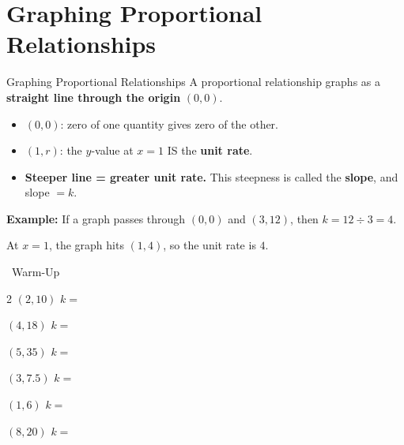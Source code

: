 \section{Graphing Proportional Relationships}

\begin{quickReview}{Graphing Proportional Relationships}
A proportional relationship graphs as a \textbf{straight line through the origin} $(0,0)$.

\begin{itemize}[leftmargin=*]
    \item $(0, 0)$: zero of one quantity gives zero of the other.
    \item $(1, r)$: the $y$-value at $x = 1$ IS the \textbf{unit rate}.
    \item \textbf{Steeper line = greater unit rate.} This steepness is called the \textbf{slope}, and slope $= k$.
\end{itemize}

\medskip
\textbf{Example:} If a graph passes through $(0,0)$ and $(3, 12)$, then $k = 12 \div 3 = 4$.

At $x = 1$, the graph hits $(1, 4)$, so the unit rate is $4$.
\end{quickReview}

\begin{practiceBox}[funGreen]{\faSun~Warm-Up}


\begin{multicols}{2}
\prob $(2, 10)$ \quad $k = $ \answerBlank[2cm]

\prob $(4, 18)$ \quad $k = $ \answerBlank[2cm]

\prob $(5, 35)$ \quad $k = $ \answerBlank[2cm]

\prob $(3, 7.5)$ \quad $k = $ \answerBlank[2cm]

\prob $(1, 6)$ \quad $k = $ \answerBlank[2cm]

\prob $(8, 20)$ \quad $k = $ \answerBlank[2cm]
\end{multicols}
\end{practiceBox}


